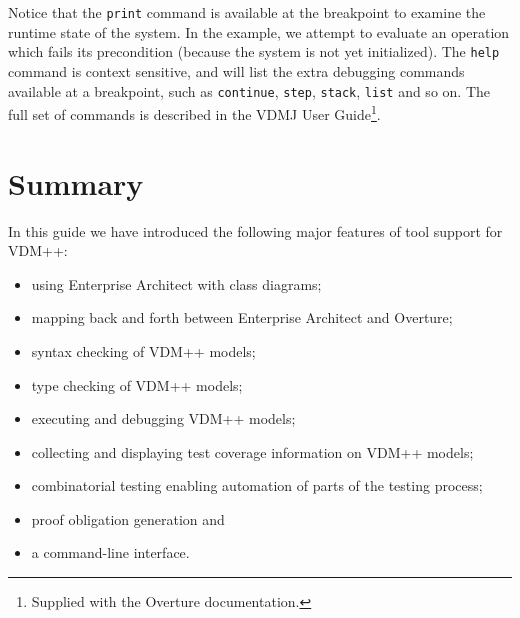 \noindent Notice that the \verb|print| command is available at the breakpoint
to examine the runtime state of the system. In the example, we attempt to evaluate an
operation which fails its precondition (because the system is not yet
initialized). The \verb|help| command is context sensitive, and will list the
extra debugging commands available at a breakpoint, such as \verb|continue|,
\verb|step|, \verb|stack|, \verb|list| and so on. The full set of commands is
described in the VDMJ User Guide\footnote{Supplied with the Overture
documentation.}.

\lstset{style=mystyle,language=VDM++}

\section{Summary}\label{sec:toolintrosummary}

In this guide we have introduced the following major features of tool
support for VDM++:
\begin{itemize}
\item using Enterprise Architect with class diagrams;
\item mapping back and forth between Enterprise Architect and Overture;
\item syntax checking of VDM++ models;
\item type checking of VDM++ models;
\item executing and debugging VDM++ models;
\item collecting and displaying test coverage information on VDM++
  models;
\item combinatorial testing enabling automation of parts of the
  testing process; 
\item proof obligation generation and
\item a command-line interface.
\end{itemize}
